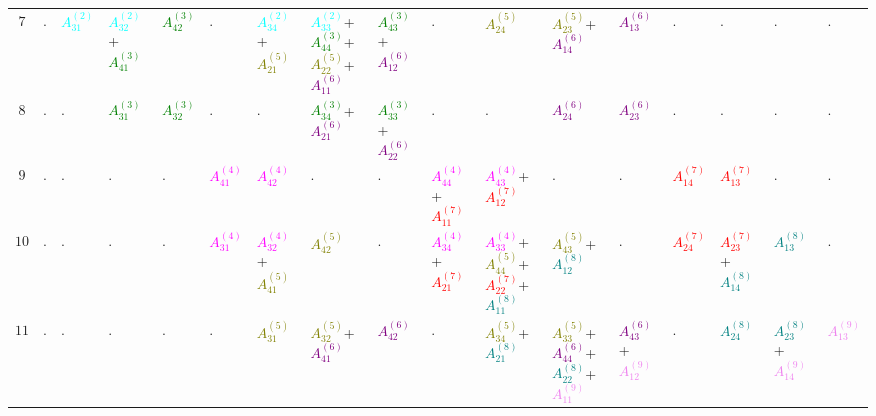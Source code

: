 \documentclass[times,namecite]{goose-article}
\begin{document}
\begin{landscape}
{\begin{tabular}{|c|C{31mm}C{31mm}C{31mm}C{31mm}C{31mm}C{31mm}C{31mm}C{31mm}C{31mm}C{31mm}C{31mm}C{31mm}C{31mm}C{31mm}C{31mm}C{31mm}|}
$7 $& . & \textcolor{cyan}{$A_{31}^{(2)}$} & \textcolor{cyan}{$A_{32}^{(2)}$}+\textcolor{green}{$A_{41}^{(3)}$} & \textcolor{green}{$A_{42}^{(3)}$} & . & \textcolor{cyan}{$A_{34}^{(2)}$}+\textcolor{olive}{$A_{21}^{(5)}$} & \textcolor{cyan}{$A_{33}^{(2)}$}+\textcolor{green}{$A_{44}^{(3)}$}+\textcolor{olive}{$A_{22}^{(5)}$}+\textcolor{purple}{$A_{11}^{(6)}$} & \textcolor{green}{$A_{43}^{(3)}$}+\textcolor{purple}{$A_{12}^{(6)}$} & . & \textcolor{olive}{$A_{24}^{(5)}$} & \textcolor{olive}{$A_{23}^{(5)}$}+\textcolor{purple}{$A_{14}^{(6)}$} & \textcolor{purple}{$A_{13}^{(6)}$} & . & . & . & . \\
$8 $& . & . & \textcolor{green}{$A_{31}^{(3)}$} & \textcolor{green}{$A_{32}^{(3)}$} & . & . & \textcolor{green}{$A_{34}^{(3)}$}+\textcolor{purple}{$A_{21}^{(6)}$} & \textcolor{green}{$A_{33}^{(3)}$}+\textcolor{purple}{$A_{22}^{(6)}$} & . & . & \textcolor{purple}{$A_{24}^{(6)}$} & \textcolor{purple}{$A_{23}^{(6)}$} & . & . & . & . \\
$9 $& . & . & . & . & \textcolor{magenta}{$A_{41}^{(4)}$} & \textcolor{magenta}{$A_{42}^{(4)}$} & . & . & \textcolor{magenta}{$A_{44}^{(4)}$}+\textcolor{red}{$A_{11}^{(7)}$} & \textcolor{magenta}{$A_{43}^{(4)}$}+\textcolor{red}{$A_{12}^{(7)}$} & . & . & \textcolor{red}{$A_{14}^{(7)}$} & \textcolor{red}{$A_{13}^{(7)}$} & . & . \\
$10 $& . & . & . & . & \textcolor{magenta}{$A_{31}^{(4)}$} & \textcolor{magenta}{$A_{32}^{(4)}$}+\textcolor{olive}{$A_{41}^{(5)}$} & \textcolor{olive}{$A_{42}^{(5)}$} & . & \textcolor{magenta}{$A_{34}^{(4)}$}+\textcolor{red}{$A_{21}^{(7)}$} & \textcolor{magenta}{$A_{33}^{(4)}$}+\textcolor{olive}{$A_{44}^{(5)}$}+\textcolor{red}{$A_{22}^{(7)}$}+\textcolor{teal}{$A_{11}^{(8)}$} & \textcolor{olive}{$A_{43}^{(5)}$}+\textcolor{teal}{$A_{12}^{(8)}$} & . & \textcolor{red}{$A_{24}^{(7)}$} & \textcolor{red}{$A_{23}^{(7)}$}+\textcolor{teal}{$A_{14}^{(8)}$} & \textcolor{teal}{$A_{13}^{(8)}$} & . \\
$11 $& . & . & . & . & . & \textcolor{olive}{$A_{31}^{(5)}$} & \textcolor{olive}{$A_{32}^{(5)}$}+\textcolor{purple}{$A_{41}^{(6)}$} & \textcolor{purple}{$A_{42}^{(6)}$} & . & \textcolor{olive}{$A_{34}^{(5)}$}+\textcolor{teal}{$A_{21}^{(8)}$} & \textcolor{olive}{$A_{33}^{(5)}$}+\textcolor{purple}{$A_{44}^{(6)}$}+\textcolor{teal}{$A_{22}^{(8)}$}+\textcolor{violet}{$A_{11}^{(9)}$} & \textcolor{purple}{$A_{43}^{(6)}$}+\textcolor{violet}{$A_{12}^{(9)}$} & . & \textcolor{teal}{$A_{24}^{(8)}$} & \textcolor{teal}{$A_{23}^{(8)}$}+\textcolor{violet}{$A_{14}^{(9)}$} & \textcolor{violet}{$A_{13}^{(9)}$} \\

\end{tabular}}
\end{landscape}
\end{document}
